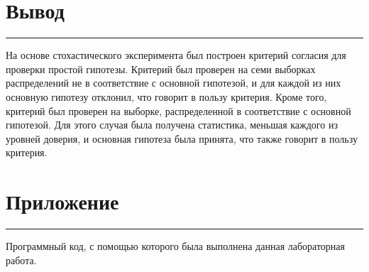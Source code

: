 \documentclass[a4paper, 14pt]{extarticle}
\begin{document}
\section*{Вывод}\vspace{-20pt}\rule{\linewidth}{0.1mm}

На основе стохастического эксперимента был построен критерий согласия для проверки 
простой гипотезы. Критерий был проверен на семи выборках распределений не в соответствие 
с основной гипотезой, и для каждой из них основную гипотезу отклонил, что говорит в 
пользу критерия. Кроме того, критерий был проверен на выборке, распределенной в 
соответствие с основной гипотезой. Для этого случая была получена статистика, меньшая 
каждого из уровней доверия, и основная гипотеза была принята, что также говорит в пользу 
критерия.


\newpage

\section*{Приложение}\vspace{-20pt}\rule{\linewidth}{0.1mm}

Программный код, с помощью которого была выполнена данная лабораторная работа.\\
\end{document}
